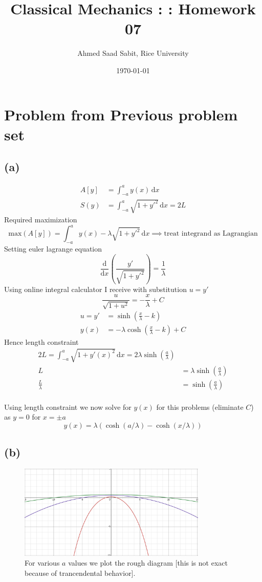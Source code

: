 \documentclass[letter, 10pts]{article}
\title{Classical Mechanics : : Homework 07}
\author{Ahmed Saad Sabit, Rice University}
\date{\today}
\begin{document}
\maketitle
\section*{Problem from Previous problem set}
\subsection*{(a)} 
\begin{align*}
	A[y] &= \int_{-a}^{a} y(x) \, \mathrm{d} x  \\
	S(y) &= \int_{-a}^{a} \sqrt{1 + y'^2}  \, \mathrm{d} x = 2L 	
\end{align*}
Required maximization 
\[
	\text{max}\left(A[y]\right) = \int_{-a}^{a}  y(x)  - \lambda \sqrt{1 + y'^2} \, \mathrm{d} x \implies \text{treat integrand as Lagrangian}
\] 
Setting euler lagrange equation 
\[
\frac{\mathrm{d} }{\mathrm{d} x} \left(\frac{y'}{\sqrt{1 + y'^2}  } \right) = \frac{1}{\lambda}
\] 
Using online integral calculator I receive with substitution $u = y'$ 
\[
\frac{u}{\sqrt{1 + u^2} } = - \frac{x}{\lambda} + C
\] 
\begin{align*}
	u = y ' &= \sinh \left(\frac{x}{\lambda} - k\right) \\ 
	y(x) &= - \lambda \cosh \left( \frac{x}{\lambda} - k \right) + C
\end{align*}
Hence length constraint 
\begin{align*}
	2 L = \int_{-a}^{a} \sqrt{1 + y'(x)^2}  \, \mathrm{d} x = 2 \lambda \sinh \left(\frac{a}{\lambda}\right)
	\\
	L &= \lambda \sinh \left(\frac{a}{\lambda}\right) \\
	\frac{L}{\lambda} &= \sinh \left(\frac{a}{\lambda}\right) \\
\end{align*}
 
Using length constraint we now solve for $y(x)$ for this problems (eliminate $C$) as $y = 0$ for $x = \pm a$
\[
y(x) = \lambda 
\left(
\cosh \left(a / \lambda \right) - 
\cosh \left(x / \lambda\right)
\right)
\] 

\subsection*{(b)} 
\begin{figure}[H]
	\centering
	\includegraphics[width=0.8\textwidth]{ss/7/2.png}
	\caption{For various $a$ values we plot the rough diagram [this is not exact because of trancendental behavior].}
	\label{fig:ss-7-2-png}
\end{figure}
\end{document}
